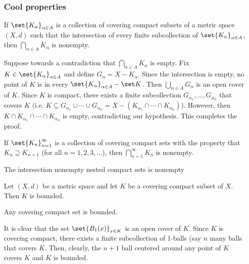 \documentclass[class=article, crop=false]{standalone}
\begin{document}
\subsubsection*{Cool properties}

\begin{thm}
    If $\set{K_\alpha}_{\alpha \in A}$ is a collection of covering compact subsets of a metric space $(X,d)$ such that the intersection of every finite subcollection of $\set{K_\alpha}_{\alpha \in A}$, then $\bigcap_{\alpha \in A}^{} K_\alpha$ is nonempty.
\end{thm}
\begin{pf}
    Suppose towards a contradiction that $\bigcap_{\alpha \in A}^{} K_\alpha$ is empty. Fix $K \in \set{K_\alpha}_{\alpha \in A}$ and define $G_\alpha = X-K_\alpha$. Since the intersection is empty, no point of $K$ is in every $\set{K_\alpha}_{\alpha \in A} - \set K$. Then $\bigcup_{\alpha \in A}^{} G_\alpha$
    is an open cover of $K$. Since $K$ is compact, there exists a finite subcollection $G_{\alpha_1}, \ldots, G_{\alpha_n}$ that covers $K$ (i.e. $K \subseteq G_{\alpha_1} \cup \cdots \cup G_{\alpha_n} = X-(K_{\alpha_1} \cap \cdots \cap K_{\alpha_n})$). However, then
    $K \cap K_{\alpha_1} \cap \cdots \cap K_{\alpha_n}$ is empty, contradicting our hypothesis. This completes the proof.
\end{pf}

\begin{coro}
    If $\set{K_n}_{n=1}^\infty$ is a collection of covering compact sets with the property that $K_n \supseteq K_{n+1}$ (for all $n=1,2,3,\ldots$), then $\bigcap_{n=1}^{\infty} K_n$ is nonempty.
\end{coro}
\begin{slogan}
    The intersection nonempty nested compact sets is nonempty
\end{slogan}


\begin{thm}
    Let $(X,d)$ be a metric space and let $K$ be a covering compact subset of $X$. Then $K$ is bounded.
\end{thm}
\begin{slogan}
    Any covering compact set is bounded.
\end{slogan}
\begin{pf}
    It is clear that the set $\set{B_1(x)}_{x \in K}$ is an open cover of $K$. Since $K$ is covering compact, there exists a finite subcollection of 1-balls (say $n$ many balls that covers $K$. Then, clearly, the $n+1$ ball centered around any point of $K$ covers $K$ and $K$ is bounded.
\end{pf}
\end{document}
